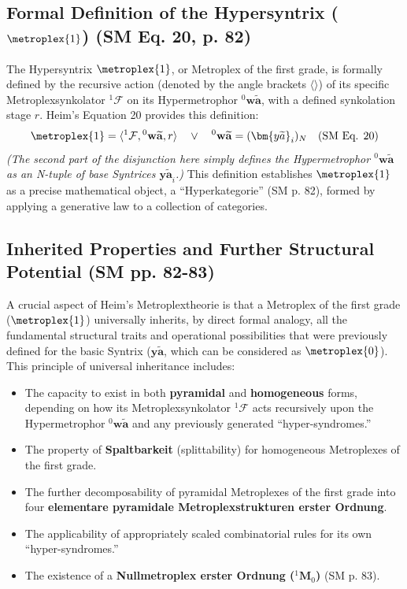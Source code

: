 \documentclass[
    12pt,              %
    a4paper,           %
    headings=normal,   %
    twoside=true,      %
    BCOR=8mm,          %
]{scrbook}
\newcommand{\q}[1]{\enquote{#1}}
\newcommand{\syntrix}{\bm{y\widetilde{a}}}
\newcommand{\hypersyntrix}{\metroplex{1}}
\newcommand{\hypermetrophor}[1]{{}^{#1}\mathbf{w\widetilde{a}}}
\newcommand{\metroplexsynkolator}[1]{{}^{#1}\mathcal{F}}
\newcommand{\nullmetroplex}[1]{{}^{#1}\mathbf{M}_0}
\begin{document}
\subsection{Formal Definition of the Hypersyntrix (\(\hypersyntrix\)) (SM Eq. 20, p. 82)}
\label{sec:ch5_hypersyntrix_formal_def}
The Hypersyntrix \(\hypersyntrix\), or Metroplex of the first grade, is formally defined by the recursive action (denoted by the angle brackets \(\langle \rangle\)) of its specific Metroplexsynkolator \(\metroplexsynkolator{1}\) on its Hypermetrophor \(\hypermetrophor{0}\), with a defined synkolation stage \(r\). Heim’s Equation 20 provides this definition:
\begin{equation} \label{eq:original_metroplex_1} %
\hypersyntrix = \langle \metroplexsynkolator{1}, \hypermetrophor{0}, r \rangle \quad \lor \quad \hypermetrophor{0} = (\syntrix_i)_N \quad (\text{SM Eq. 20})
\end{equation}
\textit{(The second part of the disjunction here simply defines the Hypermetrophor \(\hypermetrophor{0}\) as an N-tuple of base Syntrices \(\syntrix_i\).)}
This definition establishes \(\hypersyntrix\) as a precise mathematical object, a \q{Hyperkategorie} (SM p. 82), formed by applying a generative law to a collection of categories.

\subsection{Inherited Properties and Further Structural Potential (SM pp. 82-83)}
\label{sec:ch5_hypersyntrix_inherited_properties}
A crucial aspect of Heim's Metroplextheorie is that a Metroplex of the first grade (\(\hypersyntrix\)) universally inherits, by direct formal analogy, all the fundamental structural traits and operational possibilities that were previously defined for the basic Syntrix (\(\syntrix\), which can be considered as \(\metroplex{0}\)). This principle of universal inheritance includes:
\begin{itemize}
    \item   The capacity to exist in both \textbf{pyramidal} and \textbf{homogeneous} forms, depending on how its Metroplexsynkolator \(\metroplexsynkolator{1}\) acts recursively upon the Hypermetrophor \(\hypermetrophor{0}\) and any previously generated \q{hyper-syndromes.}
    \item   The property of \textbf{Spaltbarkeit} (splittability) for homogeneous Metroplexes of the first grade.
    \item   The further decomposability of pyramidal Metroplexes of the first grade into four \textbf{elementare pyramidale Metroplexstrukturen erster Ordnung}.
    \item   The applicability of appropriately scaled combinatorial rules for its own \q{hyper-syndromes.}
    \item   The existence of a \textbf{Nullmetroplex erster Ordnung (\(\nullmetroplex{1}\))} (SM p. 83).
\end{itemize}
\end{document}
